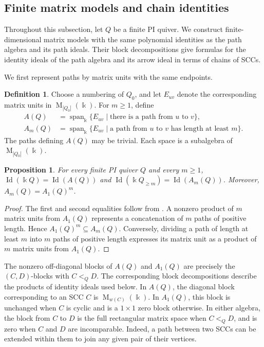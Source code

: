 \documentclass[11pt,reqno]{amsart}
\newcommand{\kk}{\Bbbk}
\newcommand{\Id}{\operatorname{Id}}
\newcommand{\Mat}{\operatorname{M}}
\newtheorem{proposition}[theorem]{Proposition}
\theoremstyle{definition}
\newtheorem{definition}[theorem]{Definition}
\theoremstyle{remark}
\numberwithin{equation}{section}
\begin{document}


\subsection{Finite matrix models and chain identities}
\label{sec:positive-paths}

Throughout this subsection, let $Q$ be a finite PI quiver.
We construct finite-dimensional matrix models with the same
polynomial identities as the path algebra and its path ideals.
Their block
decompositions give formulas for the identity ideals of the path
algebra and its arrow ideal in terms of chains of SCCs.

We first represent paths by matrix units with the same endpoints.

\begin{definition}\label{def:path-matrix-models}
Choose a numbering of $Q_0$, and let $E_{uv}$ denote the
corresponding matrix units in $\Mat_{|Q_0|}(\kk)$.
For $m\ge1$, define
\begin{align*}
 A(Q)&=\operatorname{span}_{\kk}
 \{E_{uv}\mid\text{there is a path from $u$ to $v$}\},\\
 A_m(Q)&=\operatorname{span}_{\kk}
 \{E_{uv}\mid\text{a path from $u$ to $v$ has length at least $m$}\}.
\end{align*}
The paths defining $A(Q)$ may be trivial.
Each space is
a subalgebra of $\Mat_{|Q_0|}(\kk)$.
\end{definition}

\begin{proposition}\label{prop:tail-models}
For every finite PI quiver $Q$ and every $m\ge1$,
 $\Id(\kk Q)=\Id(A(Q))$ and $
 \Id(\kk Q_{\ge m})=\Id(A_m(Q))$.
Moreover, $A_m(Q)=A_1(Q)^m$.
\end{proposition}

\begin{proof}
The first and second equalities follow from \cite[Theorem~1]{BereleEtAl2026}.
A nonzero product of $m$ matrix units from $A_1(Q)$ represents a
concatenation of $m$ paths of positive length. Hence
$A_1(Q)^m\subseteq A_m(Q)$. Conversely, dividing a path of length
at least $m$ into $m$ paths of positive length expresses its matrix
unit as a product of $m$ matrix units from $A_1(Q)$.
\end{proof}




The nonzero off-diagonal blocks of $A(Q)$ and $A_1(Q)$
are precisely the $(C,D)$-blocks with $C<_Q D$.
The corresponding block decompositions describe the products of
identity ideals used below.
In $A(Q)$, the diagonal block corresponding to an SCC $C$ is
$\Mat_{w(C)}(\kk)$.
In $A_1(Q)$, this block is unchanged when $C$ is cyclic and is a
$1\times1$ zero block otherwise.
In either algebra, the block from $C$ to $D$ is the full
rectangular matrix space when $C<_Q D$, and is zero when $C$ and
$D$ are incomparable. Indeed, a path between two SCCs can be
extended within them to join any given pair of their vertices.
\end{document}
